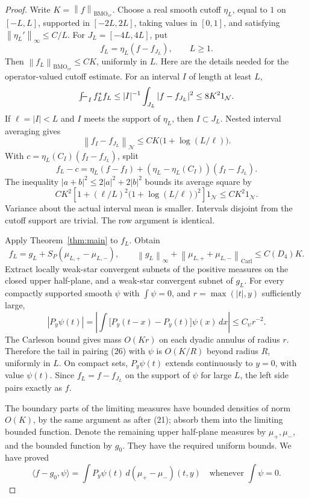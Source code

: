\documentclass[11pt]{article}
\newcommand{\N}{\mathcal N}
\newcommand{\BMO}{\mathrm{BMO}}
\newcommand{\Carl}{\mathrm{Carl}}
\newcommand{\norm}[1]{\left\|#1\right\|}
\newcommand{\fint}{\mathop{\textstyle\int\kern-1.1ex-}\nolimits}
\begin{document}
\begin{proof}
Write \(K=\norm{f}_{\BMO_{cr}}\).
Choose a real smooth cutoff \(\eta_L\), equal to \(1\) on
\([-L,L]\), supported in \([-2L,2L]\), taking values in \([0,1]\),
and satisfying \(\norm{\eta_L'}_\infty\le C/L\).
For \(J_L=[-4L,4L]\), put
\[
 f_L=\eta_L(f-f_{J_L}),\qquad L\ge1.
\]
Then \(\norm{f_L}_{\BMO_{cr}}\le CK\), uniformly in \(L\).
Here are the details needed for the operator-valued cutoff estimate.
For an interval \(I\) of length at least \(L\),
\[
 \fint_I f_L^*f_L
 \le |I|^{-1}\int_{J_L}|f-f_{J_L}|^2
 \le 8K^2 1_\N.
\]
If \(\ell=|I|<L\) and \(I\) meets the support of \(\eta_L\),
then \(I\subset J_L\). Nested interval averaging gives
\[
 \norm{f_I-f_{J_L}}_\N
 \le CK\bigl(1+\log(L/\ell)\bigr).
\]
With \(c=\eta_L(C_I)(f_I-f_{J_L})\), split
\[
 f_L-c=\eta_L(f-f_I)
       +(\eta_L-\eta_L(C_I))(f_I-f_{J_L}).
\]
The inequality \(|a+b|^2\le2|a|^2+2|b|^2\) bounds its average square by
\[
 CK^2\left[1+(\ell/L)^2
          \bigl(1+\log(L/\ell)\bigr)^2\right]1_\N
 \le CK^2 1_\N.
\]
Variance about the actual interval mean is smaller. Intervals disjoint
from the cutoff support are trivial. The row argument is identical.

Apply Theorem~\ref{thm:main} to \(f_L\). Obtain
\[
 f_L=g_L+S_P(\mu_{L,+}-\mu_{L,-}),\qquad
 \norm{g_L}_\infty+
 \norm{\mu_{L,+}+\mu_{L,-}}_{\Carl}\le C(D_4)K.       \tag{26}
\]
Extract locally weak-star convergent subnets of the positive measures
on the closed upper half-plane, and a weak-star convergent subnet of
\(g_L\). For every compactly supported smooth \(\psi\) with
\(\int\psi=0\), and \(r=\max(|t|,y)\) sufficiently large,
\[
 |P_y\psi(t)|
 =\left|\int\bigl[P_y(t-x)-P_y(t)\bigr]\psi(x)\,dx\right|
 \le C_\psi r^{-2}.                              \tag{27}
\]
The Carleson bound gives mass \(O(Kr)\) on each dyadic annulus of radius
\(r\). Therefore the tail in pairing (26) with \(\psi\) is \(O(K/R)\)
beyond radius \(R\), uniformly in \(L\). On compact sets, \(P_y\psi(t)\)
extends continuously to \(y=0\), with value \(\psi(t)\).
Since \(f_L=f-f_{J_L}\) on the support of \(\psi\) for large \(L\),
the left side pairs exactly as \(f\).

The boundary parts of the limiting measures have bounded densities
of norm \(O(K)\), by the same argument as after (21); absorb them into
the limiting bounded function. Denote the remaining upper half-plane
measures by \(\mu_+,\mu_-\), and the bounded function by \(g_0\).
They have the required uniform bounds. We have proved
\[
 \langle f-g_0,\psi\rangle
 =\int P_y\psi(t)\,d(\mu_+-\mu_-)(t,y)
 \quad\text{whenever }\int\psi=0.                \tag{28}
\]


\end{proof}
\end{document}
